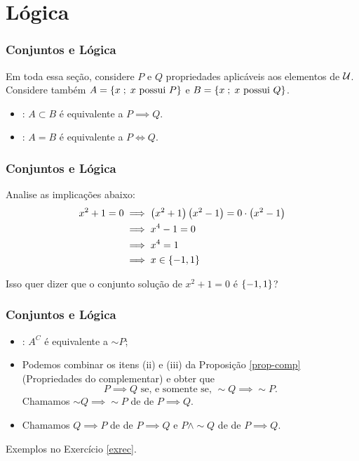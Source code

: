 \documentclass[brazil, notheorems, 10pt]{beamer}
\begin{document}
\section{Lógica}
\begin{frame}
\frametitle{Conjuntos e Lógica} %

Em toda essa seção, considere $P$ e $Q$ propriedades aplicáveis aos
elementos de $\mathcal U$. Considere também $A = \left\{x \;;\; x \text{ possui
} P\right\}$ e $B= \left\{x \;;\; x \text{ possui } Q\right\}$.

\begin{itemize}
  \item {}: $A \subset B$ é equivalente a
  $P \implies Q$.
  \item {}: $A=B$ é equivalente a $P
  \iff Q$.
\end{itemize}
\end{frame}
\begin{frame}
\frametitle{Conjuntos e Lógica} %

\begin{Exem}
Analise as implicações abaixo:
\begin{align*}
x^2+1=0 & \implies \left(x^2 +1 \right) \left( x^2-1 \right) = 0
\cdot \left( x^2-1 \right) \\
& \implies x^4 - 1 = 0 \\
& \implies x^4 = 1 \\
& \implies x \in \left\{-1, 1\right\}
\end{align*}

Isso quer dizer que o conjunto solução de $x^2 +1 = 0$ é $\left\{-1,
1\right\}$?
\end{Exem}

\end{frame}
\begin{frame}
\frametitle{Conjuntos e Lógica} %

\begin{itemize}
  \item {}: $A^C$ é equivalente a $\sim P$;
  \item Podemos combinar os itens (ii) e (iii) da Proposição
  \ref{prop-comp} (Propriedades do complementar) e obter que $$P
  \implies Q \text{ se, e somente se, }\sim Q \implies \sim P.$$
  Chamamos $\sim Q \implies \sim P$ de  de $P
  \implies Q$.
  \item Chamamos $Q \implies P$ de  de $P \implies
  Q$ e $P \land \sim Q$ de  de $P \implies Q$.
\end{itemize}
Exemplos no Exercício \ref{exrec}.
\end{frame}
\end{document}
